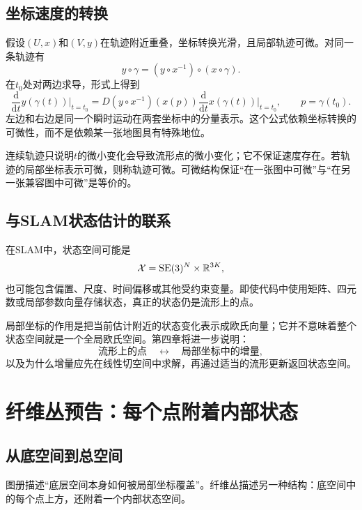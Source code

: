 \subsection{坐标速度的转换}

假设$(U,x)$和$(V,y)$在轨迹附近重叠，坐标转换光滑，且局部轨迹可微。对同一条轨迹有
\[
    y\circ\gamma
    =
    (y\circ x^{-1})\circ(x\circ\gamma).
\]
在$t_0$处对两边求导，形式上得到
\[
    \frac{\mathrm d}{\mathrm dt}y(\gamma(t))\bigg|_{t=t_0}
    =
    D(y\circ x^{-1})(x(p))
    \frac{\mathrm d}{\mathrm dt}x(\gamma(t))\bigg|_{t=t_0},
    \qquad p=\gamma(t_0).
\]
左边和右边是同一个瞬时运动在两套坐标中的分量表示。这个公式依赖坐标转换的可微性，而不是依赖某一张地图具有特殊地位。

\begin{remark}[连续与可微是两件事]
连续轨迹只说明$t$的微小变化会导致流形点的微小变化；它不保证速度存在。若轨迹的局部坐标表示可微，则称轨迹可微。可微结构保证“在一张图中可微”与“在另一张兼容图中可微”是等价的。
\end{remark}

\subsection{与SLAM状态估计的联系}

在SLAM中，状态空间可能是
\[
    \mathcal X
    =
    \operatorname{SE}(3)^N\times\mathbb{R}^{3K},
\]
也可能包含偏置、尺度、时间偏移或其他受约束变量。即使代码中使用矩阵、四元数或局部参数向量存储状态，真正的状态仍是流形上的点。

局部坐标的作用是把当前估计附近的状态变化表示成欧氏向量；它并不意味着整个状态空间就是一个全局欧氏空间。第四章将进一步说明：
\[
    \text{流形上的点}
    \quad\longleftrightarrow\quad
    \text{局部坐标中的增量},
\]
以及为什么增量应先在线性切空间中求解，再通过适当的流形更新返回状态空间。


\section{纤维丛预告：每个点附着内部状态}

\subsection{从底空间到总空间}

图册描述“底层空间本身如何被局部坐标覆盖”。纤维丛描述另一种结构：底空间中的每个点上方，还附着一个内部状态空间。


